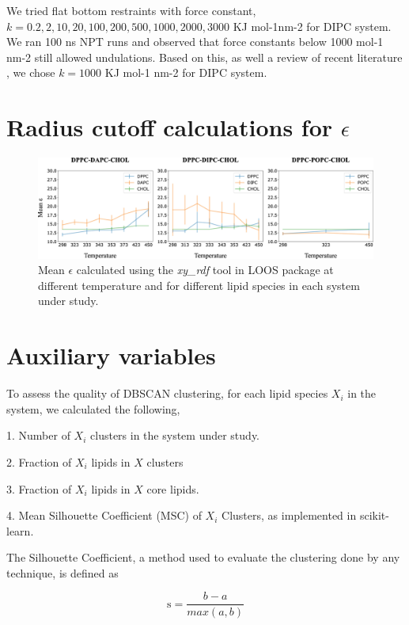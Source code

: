 \documentclass[10pt]{article}
\let\oldsection\section
\renewcommand{\section}{\clearpage\oldsection}
\begin{document}
We tried flat bottom restraints with force constant, $k = 0.2, 2, 10, 20, 100, 200, 500, 1000, 2000, 3000$ KJ mol-1nm-2 for DIPC system.
We ran 100 ns NPT runs and observed that force constants below 1000 mol-1 nm-2 still allowed undulations. Based on this, as well a review of recent literature
\cite{Su2020}, we chose $k = 1000$ KJ mol-1 nm-2 for DIPC system.


\section*{Radius cutoff calculations for $\epsilon$}

\begin{figure}[hbt!]
    \centering
    \includegraphics[width=6.5in]{Figures/Supplementary/epsilon/placeholder.jpg}
    \caption{Mean $\epsilon$ calculated using the \textit{xy\_rdf} tool in LOOS package at different temperature and for different lipid species in each system under study.}
    \label{figs1:view}
\end{figure}

\section*{Auxiliary variables}

To assess the quality of DBSCAN clustering, for each lipid species $X_i$ in the system, we calculated the following, 

1. Number of $X_i$ clusters in the system under study.

2. Fraction of $X_i$ lipids in $X$ clusters

3. Fraction of $X_i$ lipids in $X$ core lipids.

4. Mean Silhouette Coefficient (MSC) of $X_i$ Clusters, as implemented in scikit-learn.

The Silhouette Coefficient, a method used to evaluate the clustering done by any technique, is defined as 

\begin{equation}
\label{eq:SC}
\text{s} = \frac{b - a}{max(a,b)}
\end{equation}
\end{document}
